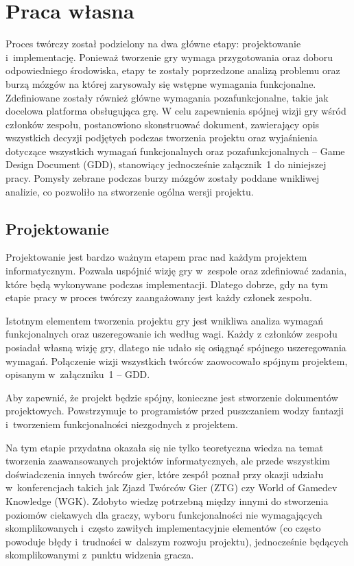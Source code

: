\chapter{Praca własna}
Proces twórczy został podzielony na dwa główne etapy: projektowanie i~implementację. Ponieważ tworzenie gry wymaga przygotowania oraz doboru odpowiedniego środowiska, etapy te zostały poprzedzone analizą problemu oraz burzą mózgów na której zarysowały się wstępne wymagania funkcjonalne. Zdefiniowane zostały również główne wymagania pozafunkcjonalne, takie jak docelowa platforma obsługująca grę. W celu zapewnienia spójnej wizji gry wśród członków zespołu, postanowiono skonstruować dokument, zawierający opis wszystkich decyzji podjętych podczas tworzenia projektu oraz wyjaśnienia dotyczące wszystkich wymagań funkcjonalnych oraz pozafunkcjonalnych -- Game Design Document (GDD), stanowiący jednocześnie załącznik~1 do niniejszej pracy.  Pomysły zebrane podczas burzy mózgów zostały poddane wnikliwej analizie, co pozwoliło na stworzenie ogólna wersji projektu. 

\section{Projektowanie}
Projektowanie jest bardzo ważnym etapem prac nad każdym projektem informatycznym. Pozwala uspójnić wizję gry w~zespole oraz zdefiniować zadania, które będą wykonywane podczas implementacji. Dlatego dobrze, gdy na tym etapie pracy w proces twórczy zaangażowany jest każdy członek zespołu. 

Istotnym elementem tworzenia projektu gry jest wnikliwa analiza wymagań funkcjonalnych oraz uszeregowanie ich według wagi. Każdy z członków zespołu posiadał własną wizję gry, dlatego nie udało się osiągnąć spójnego uszeregowania wymagań. Połączenie wizji wszystkich twórców zaowocowało spójnym projektem, opisanym w~załączniku~1 -- GDD. 

Aby zapewnić, że projekt będzie spójny, konieczne jest stworzenie dokumentów projektowych. Powstrzymuje to programistów przed puszczaniem wodzy fantazji i~tworzeniem funkcjonalności niezgodnych z projektem. 

Na tym etapie przydatna okazała się nie tylko teoretyczna wiedza na temat tworzenia zaawansowanych projektów informatycznych, ale przede wszystkim doświadczenia innych twórców gier, które zespół poznał przy okazji udziału w~konferencjach takich jak Zjazd Twórców Gier (ZTG) czy World of Gamedev Knowledge (WGK). Zdobyto wiedzę potrzebną między innymi do stworzenia poziomów ciekawych dla graczy, wyboru funkcjonalności nie wymagających skomplikowanych i~często zawiłych implementacyjnie elementów (co często powoduje błędy i~trudności w~dalszym rozwoju projektu), jednocześnie będących skomplikowanymi z~punktu widzenia gracza. 

